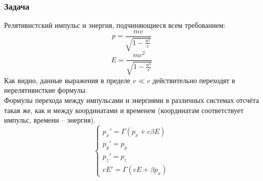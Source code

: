 \documentclass[12pt]{article}
\begin{document}
\subsubsection{Задача}
Релятивистский импульс и энергия, подчиняющиеся всем требованием:
\begin{equation}
    p=\frac{mv}{\sqrt{1-\frac{u^2}{c}}}
\end{equation}
\begin{equation}
    E=\frac{mc^2}{\sqrt{1-\frac{u^2}{c}}}
\end{equation}
Как видно, данные выражения в пределе $v\ll c$ действительно переходят в нерелятивисткие формулы.\\
Формулы перехода между импульсами и энергиями в различных системах отсчёта такая же, как и между координатами и временем (координатам соответствует импульс, времени -- энергия).
\begin{equation}
    \begin{cases}
    p_x' = \Gamma(p_x+c\beta E)\\
    p_y' = p_y\\
    p_z' = p_z\\
    cE' = \Gamma(cE+\beta p_x)
    \end{cases}
\end{equation}
\end{document}
